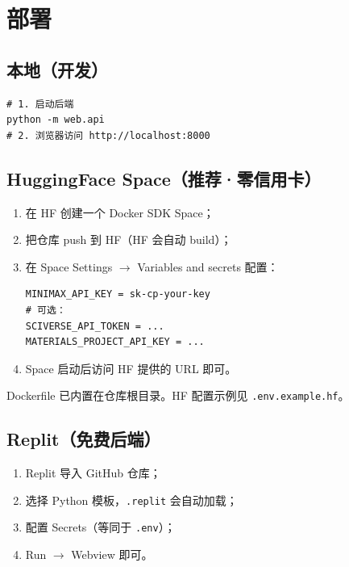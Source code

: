 \documentclass[11pt,a4paper]{article}
\begin{document}
\section{部署}

\subsection{本地（开发）}

\begin{verbatim}
# 1. 启动后端
python -m web.api
# 2. 浏览器访问 http://localhost:8000
\end{verbatim}

\subsection{HuggingFace Space（推荐·零信用卡）}

\begin{enumerate}[leftmargin=2em]
\item 在 HF 创建一个 Docker SDK Space；
\item 把仓库 push 到 HF（HF 会自动 build）；
\item 在 Space Settings $\rightarrow$ Variables and secrets 配置：
\begin{verbatim}
MINIMAX_API_KEY = sk-cp-your-key
# 可选：
SCIVERSE_API_TOKEN = ...
MATERIALS_PROJECT_API_KEY = ...
\end{verbatim}
\item Space 启动后访问 HF 提供的 URL 即可。
\end{enumerate}

Dockerfile 已内置在仓库根目录。HF 配置示例见 \texttt{.env.example.hf}。

\subsection{Replit（免费后端）}

\begin{enumerate}[leftmargin=2em]
\item Replit 导入 GitHub 仓库；
\item 选择 Python 模板，\texttt{.replit} 会自动加载；
\item 配置 Secrets（等同于 \texttt{.env}）；
\item Run $\rightarrow$ Webview 即可。
\end{enumerate}
\end{document}
